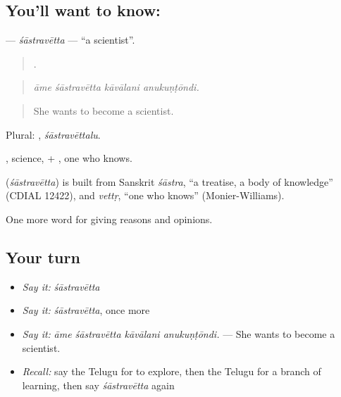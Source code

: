 \subsection*{You'll want to know: }
\textbf{} — \emph{śāstravētta} — \textquotedblleft{}a scientist\textquotedblright{}.

\begin{quote}
   .
\end{quote}

\begin{quote}
\emph{āme śāstravētta kāvālani anukuṇṭōndi.}
\end{quote}

\begin{quote}
She wants to become a scientist.
\end{quote}

Plural: , \emph{śāstravēttalu}.

, science, + , one who knows.

\begin{cousinweb}
\textbf{} (\emph{śāstravētta}) is built from Sanskrit \emph{śāstra}, \textquotedblleft{}a treatise, a body of knowledge\textquotedblright{} (CDIAL 12422), and \emph{vettṛ}, \textquotedblleft{}one who knows\textquotedblright{} (Monier-Williams).
\end{cousinweb}

\begin{grammarlens}[title={What you've built}]
One more word for giving reasons and opinions.
\end{grammarlens}

\subsection*{Your turn}
\begin{itemize}
\raggedright
  \item \emph{Say it:} \emph{śāstravētta}
  \item \emph{Say it:} \emph{śāstravētta}, once more
  \item \emph{Say it:} \emph{āme śāstravētta kāvālani anukuṇṭōndi.} — She wants to become a scientist.
  \item \emph{Recall:} say the Telugu for to explore, then the Telugu for a branch of learning, then say \emph{śāstravētta} again
\end{itemize}

